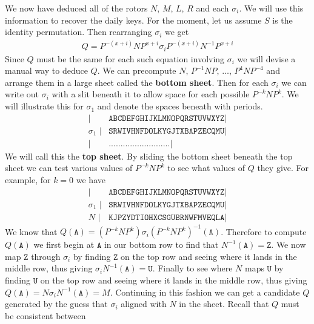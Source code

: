We now have deduced all of the rotors $N$, $M$, $L$, $R$ and each
$\sigma_i$. We will use this information to recover the daily keys.
For the moment, let us assume $S$ is the identity permutation. Then
rearranging $\sigma_i$ we get
\begin{align}
	Q = P^{-(x+i)}NP^{x+i}\sigma_iP^{-(x+i)}N^{-1}P^{x+i} \label{eq:q_eq}
\end{align}
Since $Q$ must be the same for each such equation involving
$\sigma_i$ we will devise a manual way to deduce $Q$. We can
precompute $N$, $P^{-1}NP$, $\dots$, $P^{4}NP^{-4}$ and arrange them
in a large sheet called the {\bf{bottom sheet}}.
Then for each $\sigma_i$ we can write out $\sigma_i$ with a slit
beneath it to allow space for each possible $P^{-k}NP^k$. We will
illustrate this for $\sigma_1$ and denote the spaces beneath with periods.
\begin{align*}
	\texttt{|}          & \texttt{ABCDEFGHIJKLMNOPQRSTUVWXYZ} \texttt{|} \\
	\sigma_1\texttt{ |} & \texttt{SRWIVHNFDOLKYGJTXBAPZECQMU} \texttt{|} \\
	\texttt{|}          & \texttt{..........................} \texttt{|}
\end{align*}
We will call this the {\bf{top sheet}}. By sliding the bottom sheet
beneath the top sheet we can test various values of $P^{-k}NP^{k}$ to
see what values of $Q$ they give. For example, for $k = 0$ we have
\begin{align*}
	\texttt{|}          & \texttt{ABCDEFGHIJKLMNOPQRSTUVWXYZ} \texttt{|} \\
	\sigma_1\texttt{ |} & \texttt{SRWIVHNFDOLKYGJTXBAPZECQMU} \texttt{|} \\
	N \texttt{ |}       & \texttt{KJPZYDTIOHXCSGUBRNWFMVEQLA} \texttt{|}
\end{align*}
We know that $Q(\texttt{A}) =
	(P^{-k}NP^k)\sigma_i(P^{-k}NP^k)^{-1}(\texttt{A})$. Therefore to compute
$Q(\texttt{A})$ we first begin at $\texttt{A}$ in our bottom row to
find that $N^{-1}(\texttt{A})=\texttt{Z}$. We now map $\texttt{Z}$
through $\sigma_i$ by finding $\texttt{Z}$ on the top row and seeing
where it lands in the middle row, thus giving
$\sigma_iN^{-1}(\texttt{A}) = \texttt{U}$. Finally to see where $N$
maps $\texttt{U}$ by finding $\texttt{U}$ on the top row and seeing
where it lands in the middle row, thus giving $Q(\texttt{A}) =
	N\sigma_iN^{-1}(\texttt{A}) = M$. Continuing in this fashion we can
get a candidate $Q$ generated by the guess that $\sigma_i$ aligned
with $N$ in the sheet. Recall that $Q$ must be consistent between
